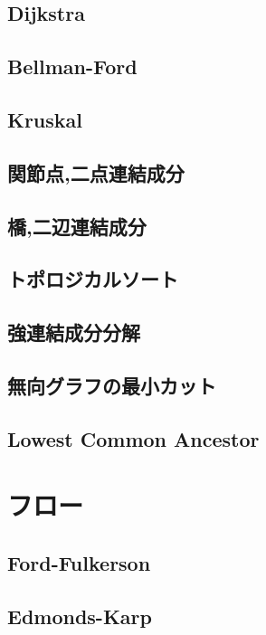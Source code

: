 \documentclass[landscape,twocolumn,9pt]{jsarticle}
\begin{document}
\subsection{Dijkstra}

\subsection{Bellman-Ford}

\subsection{Kruskal}

\subsection{関節点,二点連結成分}

\subsection{橋,二辺連結成分}

\subsection{トポロジカルソート}

\subsection{強連結成分分解}

\subsection{無向グラフの最小カット}

\subsection{Lowest Common Ancestor}


\section{フロー}

\subsection{Ford-Fulkerson}

\subsection{Edmonds-Karp}

\end{document}

